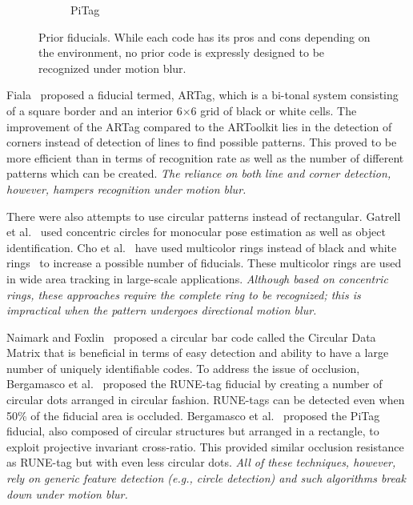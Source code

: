 \begin{figure}[b!]
\begin{subfigure}[b]{0.2\linewidth}
  PiTag\quad~\cite{Pitag13}
 \end{subfigure}
 \caption[Prior fiducials]{Prior fiducials. While each code has its pros and
 cons depending on the environment, no prior code is expressly designed to be
 recognized under motion blur.}
 \label{fig:previous_work}
\end{figure}


Fiala~\cite{Fiala05} proposed a fiducial termed, ARTag, which is a
bi-tonal system consisting of a square border and an interior
6$\times$6 grid of black or white cells. The improvement of the ARTag
compared to the ARToolkit lies in the detection of corners instead of
detection of lines to find possible patterns.  This proved to be more
efficient than \cite{ARToolkit02} in terms of recognition rate as well
as the number of different patterns which can be created.  {\it The
reliance on both line and corner detection, however, hampers
recognition under motion blur.}

There were also attempts to use circular patterns instead of
rectangular.  Gatrell et al.~\cite{concentric} used concentric circles
for monocular pose estimation as well as object identification. Cho et
al.~\cite{Cho:2001,Cho97fastcolor} have used multicolor rings instead
of black and white rings~\cite{concentric} to increase a possible number
of fiducials.  These multicolor rings are used in wide area tracking
in large-scale applications.  {\it Although based on  concentric rings, these
approaches require the complete ring to be recognized; this is
impractical when the pattern undergoes directional motion blur.}

Naimark and Foxlin~\cite{NaimarkF02} proposed a circular bar code
called the Circular Data Matrix that is beneficial in terms of easy
detection and ability to have a large number of uniquely identifiable
codes.  To address the issue of occlusion, Bergamasco et
al.~\cite{runetag11} proposed the RUNE-tag fiducial by creating a
number of circular dots arranged in circular fashion. RUNE-tags can be
detected even when 50\% of the fiducial area is occluded. Bergamasco
et al.~\cite{Pitag13} proposed the PiTag fiducial, also composed of
circular structures but arranged in a rectangle, to exploit projective
invariant cross-ratio.  This provided similar occlusion resistance as
RUNE-tag but with even less circular dots. {\it All of these techniques,
however, rely on generic feature detection (e.g., circle detection)
and such algorithms break down under motion blur.}\\

